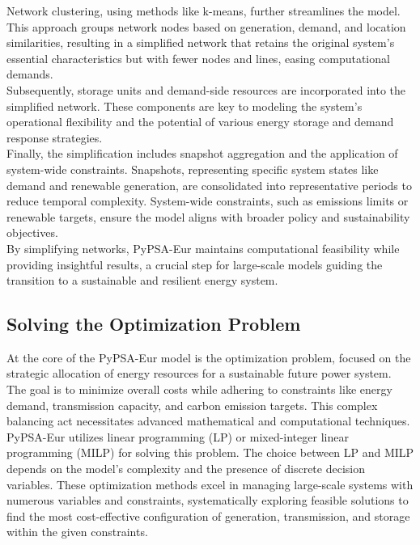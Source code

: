 Network clustering, using methods like k-means, further streamlines the model. This approach groups network nodes based on generation, demand, and location similarities, resulting in a simplified network that retains the original system's essential characteristics but with fewer nodes and lines, easing computational demands.\\

Subsequently, storage units and demand-side resources are incorporated into the simplified network. These components are key to modeling the system's operational flexibility and the potential of various energy storage and demand response strategies.\\

Finally, the simplification includes snapshot aggregation and the application of system-wide constraints. Snapshots, representing specific system states like demand and renewable generation, are consolidated into representative periods to reduce temporal complexity. System-wide constraints, such as emissions limits or renewable targets, ensure the model aligns with broader policy and sustainability objectives.\\

By simplifying networks, PyPSA-Eur maintains computational feasibility while providing insightful results, a crucial step for large-scale models guiding the transition to a sustainable and resilient energy system.


\subsection{Solving the Optimization Problem}
At the core of the PyPSA-Eur model is the optimization problem, focused on the strategic allocation of energy resources for a sustainable future power system. The goal is to minimize overall costs while adhering to constraints like energy demand, transmission capacity, and carbon emission targets. This complex balancing act necessitates advanced mathematical and computational techniques.\\

PyPSA-Eur utilizes linear programming (LP) or mixed-integer linear programming (MILP) for solving this problem. The choice between LP and MILP depends on the model's complexity and the presence of discrete decision variables. These optimization methods excel in managing large-scale systems with numerous variables and constraints, systematically exploring feasible solutions to find the most cost-effective configuration of generation, transmission, and storage within the given constraints.\\

